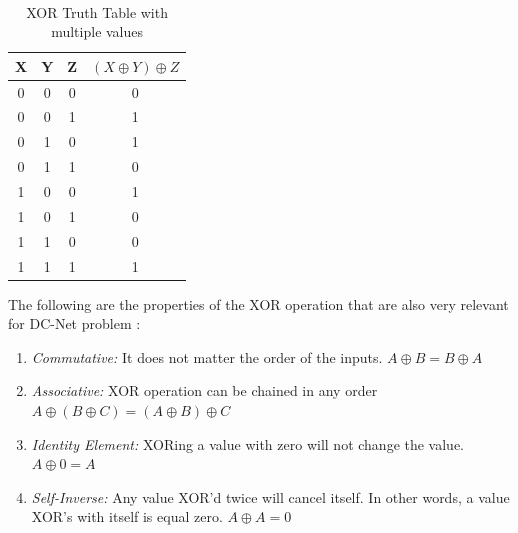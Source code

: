 \begin{table}[h!]
\centering
\caption{XOR Truth Table with multiple values}
~\\[0.5ex]
\begin{tabular}{|| c | c | c | c ||} 
 \hline
 X & Y & Z & $(X \oplus Y) \oplus Z$ \\ [0.ex] 
 \hline\hline
 0 & 0 & 0 & 0 \\ 
 0 & 0 & 1 & 1 \\
 0 & 1 & 0 & 1 \\
 0 & 1 & 1 & 0 \\
 1 & 0 & 0 & 1 \\
 1 & 0 & 1 & 0 \\
 1 & 1 & 0 & 0 \\ 
 1 & 1 & 1 & 1 \\ [1ex]
 \hline
\end{tabular}
\label{table:XORextended}
\end{table}

The following are the properties of the XOR operation that are also very relevant for DC-Net problem \cite{Lewin}: 
\begin{enumerate} \label{sec:XORproperties} \label{sec:xorproperties}
    \item \textit{Commutative:} It does not matter the order of the inputs. $A \oplus B = B \oplus A$
    \item \textit{Associative:} XOR operation can be chained in any order $A \oplus (B \oplus C) = (A \oplus B) \oplus C$
    \item \textit{Identity Element:} XORing a value with zero will not change the value. $A \oplus 0 = A$
    \item \textit{Self-Inverse:} Any value XOR'd twice will cancel itself. In other words, a value XOR's with itself is equal zero. $A \oplus A = 0$
\end{enumerate}

